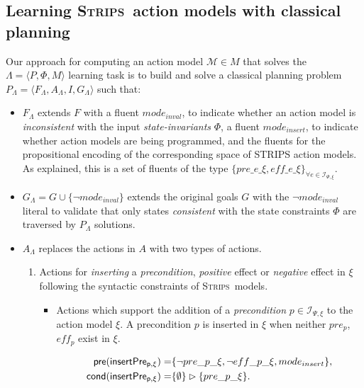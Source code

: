 \documentclass{article}
\newcommand{\tup}[1]{{\langle #1 \rangle}}
\newcommand{\pre}{\mathsf{pre}}     %
\newcommand{\cond}{\mathsf{cond}}   %
\newcommand{\strips}{\textsc{Strips}}
\begin{document}
\subsection{Learning \strips\ action models with classical planning}
Our approach for computing an action model $\mathcal{M}\in M$ that solves the $\Lambda=\tup{P,\Phi,M}$ learning task is to build and solve a classical planning problem $P_{\Lambda}=\tup{F_{\Lambda},A_{\Lambda},I,G_{\Lambda}}$ such that:
\begin{itemize}
\item $F_{\Lambda}$ extends $F$ with a fluent {\small$mode_{inval}$}, to indicate whether an action model is {\em inconsistent} with the input {\em state-invariants} $\Phi$, a fluent {\small$mode_{insert}$}, to indicate whether action models are being programmed, and the fluents for the propositional encoding of the corresponding space of STRIPS action models. As explained, this is a set of fluents of the type $\{pre\_e\_\xi, eff\_e\_\xi\}_{\forall e\in{\mathcal I}_{\Psi,\xi}}$.

\item $G_{\Lambda}= G\cup \{\neg mode_{inval}\}$ extends the original goals $G$ with the $\neg mode_{inval}$ literal to validate that only states {\em consistent} with the state constraints $\Phi$ are traversed by $P_{\Lambda}$ solutions.

\item $A_{\Lambda}$ replaces the actions in $A$ with two types of actions.
\begin{enumerate}
\item Actions for {\em inserting} a {\em precondition}, {\em positive} effect or {\em negative} effect in $\xi$ following the syntactic constraints of \strips\ models. 
\begin{itemize}
\item Actions which support the addition of a {\em precondition} $p\in {\mathcal I}_{\Psi,\xi}$ to the action model $\xi$. A precondition $p$ is inserted in $\xi$ when neither $pre_p$, $eff_p$ exist in $\xi$.

\begin{small}
\begin{align*}
\hspace*{7pt}\pre(\mathsf{insertPre_{p,\xi}})=&\{\neg pre\_p\_\xi, \neg eff\_p\_\xi, mode_{insert}\},\\
\cond(\mathsf{insertPre_{p,\xi}})=&\{\emptyset\}\rhd\{pre\_p\_\xi\}.
\end{align*}
\end{small}


\end{itemize}
\end{enumerate}
\end{itemize}
\end{document}
